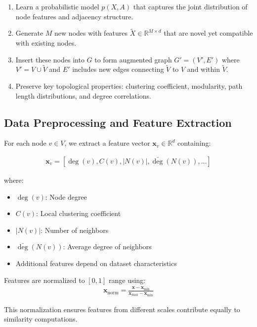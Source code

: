 \documentclass[12pt]{article}
\begin{document}
\begin{enumerate}
    \item Learn a probabilistic model $p(X, A)$ that captures the joint distribution of node features and adjacency structure.
    
    \item Generate $M$ new nodes with features $\tilde{X} \in \mathbb{R}^{M \times d}$ that are novel yet compatible with existing nodes.
    
    \item Insert these nodes into $G$ to form augmented graph $G' = (V', E')$ where $V' = V \cup \tilde{V}$ and $E'$ includes new edges connecting $\tilde{V}$ to $V$ and within $\tilde{V}$.
    
    \item Preserve key topological properties: clustering coefficient, modularity, path length distributions, and degree correlations.
\end{enumerate}

\subsection{Data Preprocessing and Feature Extraction}

For each node $v \in V$, we extract a feature vector $\mathbf{x}_v \in \mathbb{R}^d$ containing:

\begin{align}
\mathbf{x}_v = [\deg(v), C(v), |N(v)|, \bar{\deg}(N(v)), \ldots]
\end{align}

where:
\begin{itemize}
    \item $\deg(v)$: Node degree
    \item $C(v)$: Local clustering coefficient
    \item $|N(v)|$: Number of neighbors
    \item $\bar{\deg}(N(v))$: Average degree of neighbors
    \item Additional features depend on dataset characteristics
\end{itemize}

Features are normalized to $[0,1]$ range using:
\begin{align}
\mathbf{x}_{\text{norm}} = \frac{\mathbf{x} - \mathbf{x}_{\min}}{\mathbf{x}_{\max} - \mathbf{x}_{\min}}
\end{align}

This normalization ensures features from different scales contribute equally to similarity computations.
\end{document}
